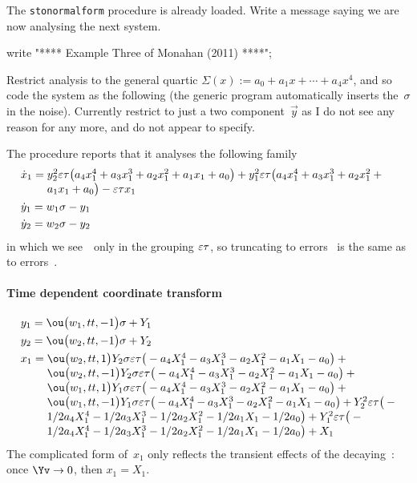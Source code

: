 The \verb|stonormalform| procedure is already loaded.
Write a message saying we are now analysing the next system.
\begin{reduce}
write "**** Example Three of Monahan (2011) ****";
\end{reduce}

Restrict analysis to the general quartic $\Sigma(x):=a_0+a_1x+\cdots+a_4x^4$, and so code the system as the following (the generic program automatically inserts the~$\sigma$ in the noise).
Currently restrict to just a two component~$\vec y$ as I do not see any reason for any more, and \cite{Monahan2011} do not appear to specify.

The procedure reports that it analyses the following family 
\begin{align*}&
\dot x_{1}=\ParMath{ y_{2}^{2} \eps \tau  \big(a_{4} x_{1}^{4}+a_{3} x_{1}^{3}+a_{
2} x_{1}^{2}+a_{1} x_{1}+a_{0}\big)+y_{1}^{2} \eps \tau  \big(a_{4} x_{1
}^{4}+a_{3} x_{1}^{3}+a_{2} x_{1}^{2}+a_{1} x_{1}+a_{0}\big)-\eps \tau  
x_{1}
}
\\&
\dot y_{1}=w_{1} \sigma -y_{1}
\\&
\dot y_{2}=w_{2} \sigma -y_{2}
\end{align*}
in which we see~\eps\ only in the grouping \(\varepsilon\tau\), so truncating to errors~ is the same as to errors~.



\paragraph{Time dependent coordinate transform}  
\begin{align*}&
y_{1}=\ou\big(w_{1},tt,-1\big) \sigma +Y_{1}
\\&
y_{2}=\ou\big(w_{2},tt,-1\big) \sigma +Y_{2}
\\&
x_{1}=\ParMath{ \ou\big(w_{2},tt,1\big) Y_{2} \sigma  \eps \tau  \big(-a_{4} X_{1}
^{4}-a_{3} X_{1}^{3}-a_{2} X_{1}^{2}-a_{1} X_{1}-a_{0}\big)+\ou\big(w_{2
},tt,-1\big) Y_{2} \sigma  \eps \tau  \big(-a_{4} X_{1}^{4}-a_{3} X_{1}
^{3}-a_{2} X_{1}^{2}-a_{1} X_{1}-a_{0}\big)+\ou\big(w_{1},tt,1\big) Y_{1
} \sigma  \eps \tau  \big(-a_{4} X_{1}^{4}-a_{3} X_{1}^{3}-a_{2} X_{1}^{
2}-a_{1} X_{1}-a_{0}\big)+\ou\big(w_{1},tt,-1\big) Y_{1} \sigma  \eps 
\tau  \big(-a_{4} X_{1}^{4}-a_{3} X_{1}^{3}-a_{2} X_{1}^{2}-a_{1} X_{1}-
a_{0}\big)+Y_{2}^{2} \eps \tau  \big(-1/2 a_{4} X_{1}^{4}-1/2 a_{3} X_{1
}^{3}-1/2 a_{2} X_{1}^{2}-1/2 a_{1} X_{1}-1/2 a_{0}\big)+Y_{1}^{2} \eps 
\tau  \big(-1/2 a_{4} X_{1}^{4}-1/2 a_{3} X_{1}^{3}-1/2 a_{2} X_{1}^{2}-
1/2 a_{1} X_{1}-1/2 a_{0}\big)+X_{1}
}
\end{align*}
The complicated form of~\(x_1\) only reflects the transient effects of the decaying~\Yv: once \(\Yv\to0\), then \(x_1=X_1\).

